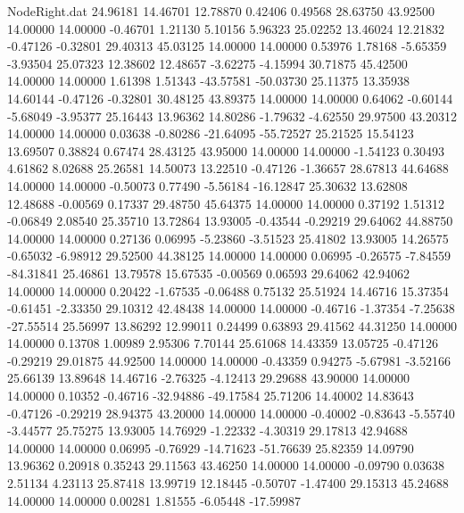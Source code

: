 \begin{filecontents}{NodeRight.dat}
  24.96181   14.46701   12.78870     0.42406    0.49568   28.63750   43.92500   14.00000   14.00000   -0.46701    1.21130    5.10156    5.96323
  25.02252   13.46024   12.21832    -0.47126   -0.32801   29.40313   45.03125   14.00000   14.00000    0.53976    1.78168   -5.65359   -3.93504
  25.07323   12.38602   12.48657    -3.62275   -4.15994   30.71875   45.42500   14.00000   14.00000    1.61398    1.51343  -43.57581  -50.03730
  25.11375   13.35938   14.60144    -0.47126   -0.32801   30.48125   43.89375   14.00000   14.00000    0.64062   -0.60144   -5.68049   -3.95377
  25.16443   13.96362   14.80286    -1.79632   -4.62550   29.97500   43.20312   14.00000   14.00000    0.03638   -0.80286  -21.64095  -55.72527
  25.21525   15.54123   13.69507     0.38824    0.67474   28.43125   43.95000   14.00000   14.00000   -1.54123    0.30493    4.61862    8.02688
  25.26581   14.50073   13.22510    -0.47126   -1.36657   28.67813   44.64688   14.00000   14.00000   -0.50073    0.77490   -5.56184  -16.12847
  25.30632   13.62808   12.48688    -0.00569    0.17337   29.48750   45.64375   14.00000   14.00000    0.37192    1.51312   -0.06849    2.08540
  25.35710   13.72864   13.93005    -0.43544   -0.29219   29.64062   44.88750   14.00000   14.00000    0.27136    0.06995   -5.23860   -3.51523
  25.41802   13.93005   14.26575    -0.65032   -6.98912   29.52500   44.38125   14.00000   14.00000    0.06995   -0.26575   -7.84559  -84.31841
  25.46861   13.79578   15.67535    -0.00569    0.06593   29.64062   42.94062   14.00000   14.00000    0.20422   -1.67535   -0.06488    0.75132
  25.51924   14.46716   15.37354    -0.61451   -2.33350   29.10312   42.48438   14.00000   14.00000   -0.46716   -1.37354   -7.25638  -27.55514
  25.56997   13.86292   12.99011     0.24499    0.63893   29.41562   44.31250   14.00000   14.00000    0.13708    1.00989    2.95306    7.70144
  25.61068   14.43359   13.05725    -0.47126   -0.29219   29.01875   44.92500   14.00000   14.00000   -0.43359    0.94275   -5.67981   -3.52166
  25.66139   13.89648   14.46716    -2.76325   -4.12413   29.29688   43.90000   14.00000   14.00000    0.10352   -0.46716  -32.94886  -49.17584
  25.71206   14.40002   14.83643    -0.47126   -0.29219   28.94375   43.20000   14.00000   14.00000   -0.40002   -0.83643   -5.55740   -3.44577
  25.75275   13.93005   14.76929    -1.22332   -4.30319   29.17813   42.94688   14.00000   14.00000    0.06995   -0.76929  -14.71623  -51.76639
  25.82359   14.09790   13.96362     0.20918    0.35243   29.11563   43.46250   14.00000   14.00000   -0.09790    0.03638    2.51134    4.23113
  25.87418   13.99719   12.18445    -0.50707   -1.47400   29.15313   45.24688   14.00000   14.00000    0.00281    1.81555   -6.05448  -17.59987

\end{filecontents}

